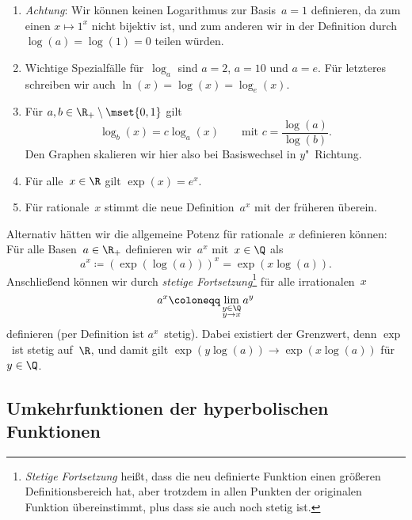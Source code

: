 \documentclass[a4paper]{article}
\begin{document}
\begin{remark}\leavevmode
    \begin{enumerate}
        \item \emph{Achtung}: Wir können keinen Logarithmus zur Basis~$a = 1$ definieren, da zum einen $x \mapsto 1^x$ nicht bijektiv ist, und zum anderen wir in der Definition durch $\log(a) = \log(1) = 0$ teilen würden.
        \item Wichtige Spezialfälle für~$\log_a$ sind $a = 2$, $a = 10$ und $a = e$. Für letzteres schreiben wir auch $\ln(x) = \log(x) = \log_e(x)$.
        \item Für $a,b \in \R_+\setminus\mset{0, 1}$ gilt
              \begin{equation*}
                  \log_b(x) = c \log_a(x) \qquad\text{mit } c = \frac{\log(a)}{\log(b)}.
              \end{equation*}
              Den Graphen skalieren wir hier also bei Basiswechsel in $y$"~Richtung.
        \item Für alle~$x \in \R$ gilt $\exp(x) = e^x$.
        \item Für rationale~$x$ stimmt die neue Definition~$a^x$ mit der früheren überein.
    \end{enumerate}
\end{remark}

\begin{remark}
    Alternativ hätten wir die allgemeine Potenz für rationale~$x$ definieren können: Für alle Basen~$a \in \R_+$ definieren wir~$a^x$ mit~$x \in \Q$ als
    \begin{equation*}
        a^x \coloneqq (\exp(\log(a)))^x = \exp(x\log(a)).
    \end{equation*}
    Anschließend können wir durch \emph{stetige Fortsetzung}\footnote{\emph{Stetige Fortsetzung} heißt, dass die neu definierte Funktion einen größeren Definitionsbereich hat, aber trotzdem in allen Punkten der originalen Funktion übereinstimmt, plus dass sie auch noch stetig ist.} für alle irrationalen~$x$
    \begin{equation*}
        a^x \coloneqq \lim_{\substack{y\in\Q\\y\to x}} a^y
    \end{equation*}
    definieren (per Definition ist $a^x$~stetig). Dabei existiert der Grenzwert, denn $\exp$~ist stetig auf~$\R$, und damit gilt $\exp(y\log(a)) \to \exp(x\log(a))$ für~$y \in \Q$.
\end{remark}

\subsection{Umkehrfunktionen der hyperbolischen Funktionen}
\end{document}

